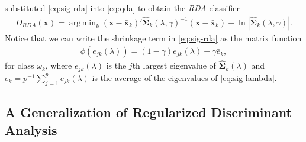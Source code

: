 \documentclass[11pt]{article}
\newcommand{\xbar}{\bar{\bm x}}
\DeclareMathOperator*{\argmin}{arg\,min}
\begin{document}
\cite{Friedman:1989tm} substituted \eqref{eq:sig-rda} into \eqref{eq:qda} to obtain the \emph{RDA} classifier
\begin{align}
	D_{RDA}(\bm x) = \argmin_{k}  (\bm x - \xbar_k)'\widehat{\bm\Sigma}_k(\lambda, \gamma)^{-1}(\bm x - \xbar_k)  + \ln |\widehat{\bm\Sigma}_k(\lambda, \gamma)|. \label{eq:rda}
\end{align}
Notice that we can write the shrinkage term in \eqref{eq:sig-rda} as the matrix function
\begin{align*}
	\phi(e_{jk}(\lambda)) = (1 - \gamma) e_{jk}(\lambda) + \gamma \bar{e}_k,
\end{align*}
for class $\omega_k$, where $e_{jk}(\lambda)$ is the $j$th largest eigenvalue of $\widehat{\bm\Sigma}_k(\lambda)$ and $\bar{e}_k = p^{-1} \sum_{j=1}^p e_{jk}(\lambda)$ is the average of the eigenvalues of \eqref{eq:sig-lambda}.

\subsection{A Generalization of Regularized Discriminant Analysis}
\end{document}
